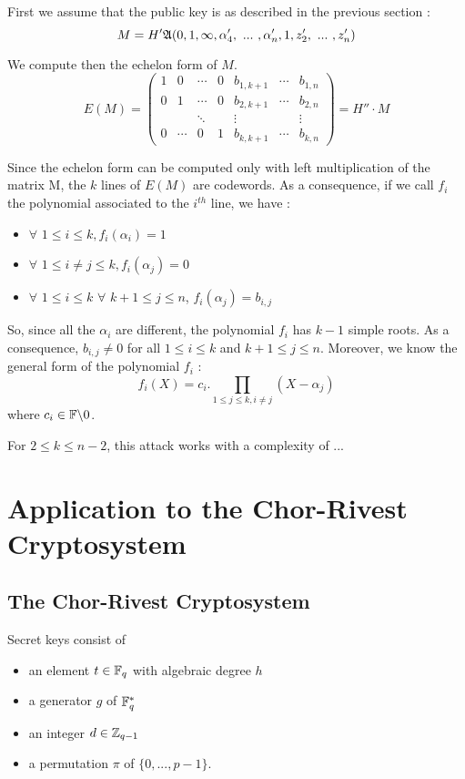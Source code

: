 \documentclass[12pt,a4paper,titlepage]{article}
\newcommand{\GF}[1]{\F_{#1}}
\begin{document}
First we assume that the public key is as described in the previous section :
$$ M = H' \mathfrak{A}(0, 1, \infty, \alpha'_4, \ ... \ , \alpha'_n, 1, z'_2, \ ... \ , z'_n) $$

We compute then the echelon form of $M$.
$$ E(M) = 
\left(
\begin{array}{ccccccc}
1 & 0 & \cdots & 0 & b_{1,k+1} & \cdots & b_{1,n} \\
0 & 1 & \cdots & 0 & b_{2,k+1} & \cdots & b_{2,n} \\
  &   & \ddots &   & \vdots &   & \vdots \\
0 & \cdots & 0 & 1 & b_{k,k+1} & \cdots & b_{k,n}
\end{array}
\right) = H'' \cdot M
$$

Since the echelon form can be computed only with left multiplication of the matrix M, the $k$ lines of $E(M)$ are codewords. As a consequence, if we call $f_i$ the polynomial associated to the $i^{th}$
line, we have :
\begin{itemize}
\item $\forall$  $1\leq i\leq k, f_i(\alpha_i)=1 $
\item $\forall$  $1\leq i\neq j\leq k, f_i(\alpha_j)=0 $
\item $\forall$  $1\leq i\leq k$ $\forall$ $k+1\leq j\leq n$, $f_i(\alpha_j)=b_{i,j} $
\end{itemize}
So, since all the $\alpha_i$ are different, the polynomial $f_i$ has $k-1$ simple roots. As a consequence, $b_{i,j}\neq0$ for all $1\leq i\leq k$ and $k+1\leq j\leq n$. Moreover, we know the general 
form of the polynomial $f_i$ :
$$f_i(X) = c_i.\prod_{1\leq j\leq k, i\neq j} (X-\alpha_j)$$ where $c_i \in \mathbb{F}\backslash{0}$.

For $2 \leq k \leq n-2$, this attack works with a complexity of ...


\newpage
\section{Application to the Chor-Rivest Cryptosystem}
\label{sec:CRcrypt}

\subsection{The Chor-Rivest Cryptosystem}

Secret keys consist of
\begin{itemize}
\item an element $t \in \GF{q}$ with algebraic degree $h$
\item a generator $g$ of $\GF{q}^{\ast} $
\item an integer $d \in \mathbb{Z}_{q-1} $
\item a permutation $\pi$ of $\{ 0, ... , p-1 \}$.
\end{itemize}
\end{document}
